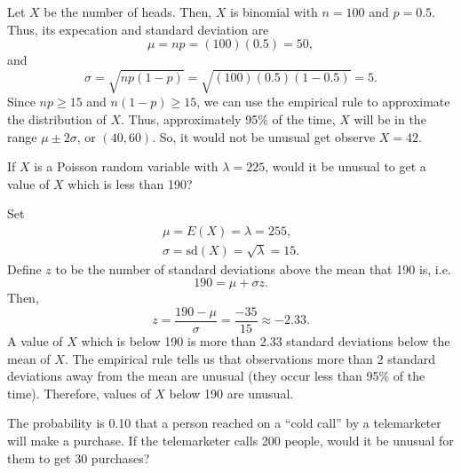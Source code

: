 \documentclass[answers,11pt]{exam}
\begin{document}
\begin{questions}

\begin{solution}
Let $X$ be the number of heads.  Then, $X$ is binomial with $n = 100$ and $p =
0.5$.  Thus, its expecation and standard deviation are
\[
  \mu = n p  = (100) (0.5) = 50,
\]
and
\[
  \sigma = \sqrt{n p (1 - p)} = \sqrt{(100) (0.5) (1 - 0.5)} = 5.
\]
Since $n p \geq 15$ and $n (1 - p) \geq 15$, we can use the empirical rule to
approximate the distribution of $X$.  Thus, approximately 95\% of the time,
$X$ will be in the range $\mu \pm 2 \sigma$, or $(40, 60)$.  So, it would not
be unusual get observe $X = 42$.

\end{solution}


\question If $X$ is a Poisson random variable with $\lambda = 225$, would it be
unusual to get a value of $X$ which is less than 190?

\begin{solution}
Set
\begin{gather*}
  \mu = E(X) = \lambda = 255, \\
  \sigma = \mathrm{sd}(X) = \sqrt{\lambda} = 15.
\end{gather*}
Define $z$ to be the number of standard deviations above the mean that 190 is,
i.e.
\[
  190 = \mu + \sigma z.
\]
Then,
\[
  z = \frac{190 - \mu}{\sigma} = \frac{-35}{15} \approx -2.33.
\]
A value of $X$ which is below 190 is more than 2.33 standard deviations
below the mean of $X$.  The empirical rule tells us that observations more
than 2 standard deviations away from the mean are unusual (they occur less
than 95\% of the time).  Therefore, values
of $X$ below 190 are unusual.
\end{solution}



\question The probability is 0.10 that a person reached on a ``cold call'' by
a telemarketer will make a purchase.  If the telemarketer calls 200 people,
would it be unusual for them to get 30 purchases?


\end{questions}
\end{document}
